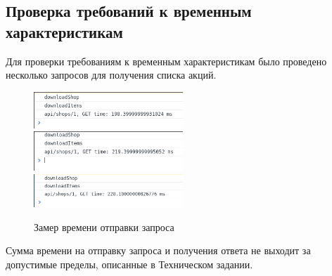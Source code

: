 \newpage
\subsection{Проверка требований к временным характеристикам}
Для проверки требованиям к временным характеристикам было проведено несколько
запросов для получения списка акций.
\begin{figure}[h!]
    \centering
    \includegraphics[width=0.5\textwidth]{./screenshots/get1.png}
    \includegraphics[width=0.5\textwidth]{./screenshots/get2.png}
    \includegraphics[width=0.5\textwidth]{./screenshots/get3.png}
    \caption{Замер времени отправки запроса}
\end{figure}

Сумма времени на отправку запроса и получения ответа не выходит за допустимые
пределы, описанные в Техническом задании.
